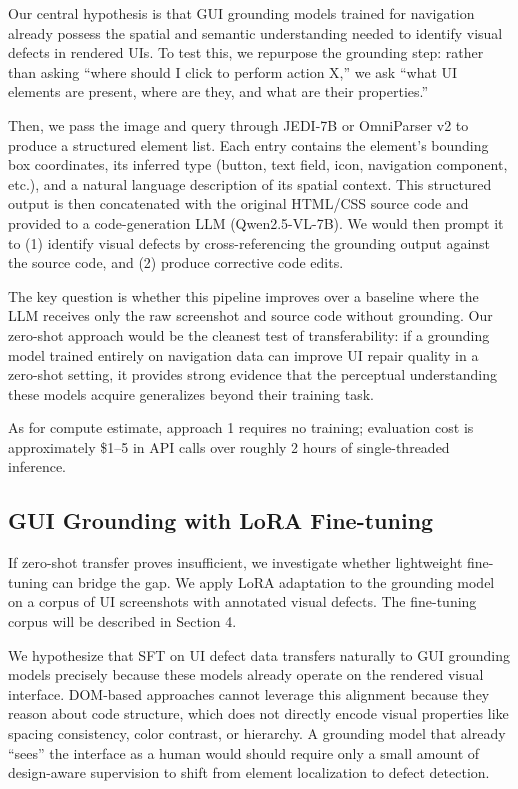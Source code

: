 \documentclass[11pt]{article}
\begin{document}
Our central hypothesis is that GUI grounding models trained for navigation already possess the spatial and semantic understanding needed to identify visual defects in rendered UIs. To test this, we repurpose the grounding step: rather than asking ``where should I click to perform action X,'' we ask ``what UI elements are present, where are they, and what are their properties.'' 

Then, we pass the image and query through JEDI-7B or OmniParser v2 to produce a structured element list. Each entry contains the element's bounding box coordinates, its inferred type (button, text field, icon, navigation component, etc.), and a natural language description of its spatial context. This structured output is then concatenated with the original HTML/CSS source code and provided to a code-generation LLM (Qwen2.5-VL-7B). We would then prompt it to (1) identify visual defects by cross-referencing the grounding output against the source code, and (2) produce corrective code edits.

The key question is whether this pipeline improves over a baseline where the LLM receives only the raw screenshot and source code without grounding. Our zero-shot approach would be the cleanest test of transferability: if a grounding model trained entirely on navigation data can improve UI repair quality in a zero-shot setting, it provides strong evidence that the perceptual understanding these models acquire generalizes beyond their training task.

As for compute estimate, approach 1 requires no training; evaluation cost is approximately \$1--5 in API calls over roughly 2 hours of single-threaded inference.

\subsection{GUI Grounding with LoRA Fine-tuning}

If zero-shot transfer proves insufficient, we investigate whether lightweight fine-tuning can bridge the gap. We apply LoRA adaptation to the grounding model on a corpus of UI screenshots with annotated visual defects. The fine-tuning corpus will be described in Section 4.

We hypothesize that SFT on UI defect data transfers naturally to GUI grounding models precisely because these models already operate on the rendered visual interface. DOM-based approaches cannot leverage this alignment because they reason about code structure, which does not directly encode visual properties like spacing consistency, color contrast, or hierarchy. A grounding model that already ``sees'' the interface as a human would should require only a small amount of design-aware supervision to shift from element localization to defect detection. 
\end{document}
